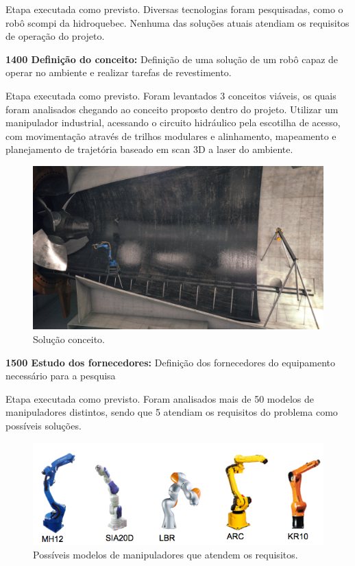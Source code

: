 Etapa executada como previsto. Diversas tecnologias foram pesquisadas, como o
robô scompi da hidroquebec. Nenhuma das soluções atuais atendiam os requisitos
de operação do projeto.

\noindent
\textbf{1400 Definição do conceito:} Definição de uma solução de um robô capaz
de operar no ambiente e realizar tarefas de revestimento.

Etapa executada como previsto. Foram levantados 3 conceitos viáveis, os quais
foram analisados chegando ao conceito proposto dentro do projeto. Utilizar um
manipulador industrial, acessando o circuito hidráulico pela escotilha de
acesso, com movimentação através de trilhos modulares e alinhamento, mapeamento
e planejamento de trajetória baseado em scan 3D a laser do ambiente.

\begin{figure}
\centering
\includegraphics[width=0.9\columnwidth]{figs/turbine_evo}
\caption{Solução conceito.}
\end{figure}

\noindent
\textbf{1500 Estudo dos fornecedores:} Definição dos fornecedores do equipamento
necessário para a pesquisa

Etapa executada como previsto. Foram analisados mais de 50 modelos de
manipuladores distintos, sendo que 5 atendiam os requisitos do problema como
possíveis soluções.

\begin{figure}[h!]
\centering
\includegraphics[width=0.9\columnwidth]{figs/robots}
\caption{Possíveis modelos de manipuladores que atendem os requisitos.}
\end{figure}

